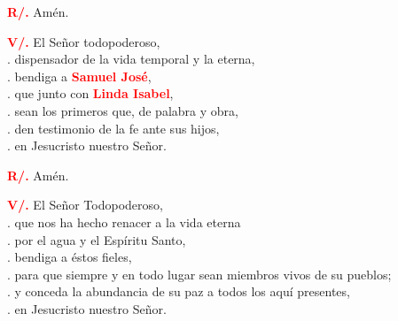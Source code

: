 \documentclass[12pt, letterpaper]{report}
\begin{document}
\noindent
\Large {\bfseries \textcolor{red}{R/.}} \hspace{0.5cm} Am\'en.\newline

\newpage

\noindent
\Large {\bfseries \textcolor{red}{V/.}} \hspace{0.5cm} El Se\~nor todopoderoso, \\
. \hspace{1.5cm} dispensador de la vida temporal y la eterna, \\
. \hspace{1.5cm} bendiga a {\bfseries \textcolor{red}{Samuel Jos\'e}}, \\
. \hspace{1.5cm} que junto con {\bfseries \textcolor{red}{Linda Isabel}}, \\
. \hspace{1.5cm} sean los primeros que, de palabra y obra, \\
. \hspace{1.5cm} den testimonio de la fe ante sus hijos, \\
. \hspace{1.5cm} en Jesucristo nuestro Se\~nor. \newline

\noindent
\Large {\bfseries \textcolor{red}{R/.}} \hspace{0.5cm} Am\'en.\newline

\noindent
\Large {\bfseries \textcolor{red}{V/.}} \hspace{0.5cm} El Se\~nor Todopoderoso, \\
. \hspace{1.5cm} que nos ha hecho renacer a la vida eterna \\
. \hspace{1.5cm} por el agua y el Esp\'iritu Santo, \\
. \hspace{1.5cm} bendiga a \'estos fieles, \\
. \hspace{1.5cm} para que siempre y en todo lugar sean miembros vivos de su pueblos; \\
. \hspace{1.5cm} y conceda la abundancia de su paz a todos los aqu\'i presentes, \\
. \hspace{1.5cm} en Jesucristo nuestro Se\~nor. \newline
\end{document}
